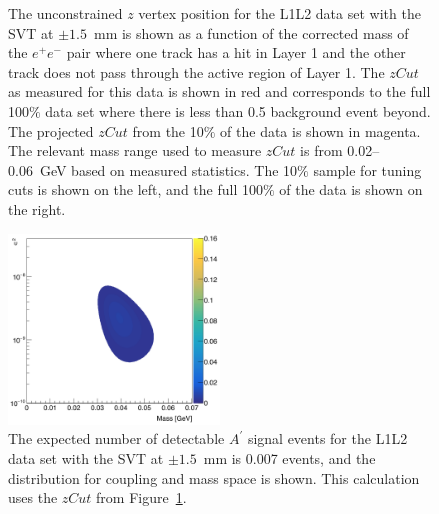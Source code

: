 \begin{figure}[hbt]
  \caption[$z$ vertex and mass distribution for the L1L2 data set with the SVT at $\pm1.5$~mm]{The unconstrained $z$ vertex position for the L1L2 data set with the SVT at $\pm1.5$~mm is shown as a function of the corrected mass of the $e^+e^-$ pair where one track has a hit in Layer 1 and the other track does not pass through the active region of Layer 1. The $zCut$ as measured for this data is shown in red and corresponds to the full 100$\%$ data set where there is less than 0.5 background event beyond. The projected $zCut$ from the 10$\%$ of the data is shown in magenta. The relevant mass range used to measure $zCut$ is from 0.02--0.06~GeV based on measured statistics. The 10$\%$ sample for tuning cuts is shown on the left, and the full 100$\%$ of the data is shown on the right.}
  \label{fig:zvm_l1l2_1p5}
\end{figure}
\begin{figure}[htb]
  \centering
      \includegraphics[width=0.5\textwidth]{pics/appendix/reachL1L2_1p5.png}
  \caption[Expected detectable $A^{\prime}$ signal yield from the L1L2 data at 1.5~mm.]{The expected number of detectable $A^{\prime}$ signal events for the L1L2 data set with the SVT at $\pm1.5$~mm is 0.007 events, and the distribution for coupling and mass space is shown. This calculation uses the $zCut$ from Figure~\ref{fig:zvm_l1l2_1p5}.}
  \label{fig:rl1l21p5}
\end{figure} 
